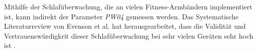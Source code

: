 Mithilfe der Schlafüberwachung, die an vielen Fitness-Armbändern implementiert ist, kann indirekt der Parameter \textit{PW04} gemessen werden. Das Systematische Literaturreview von Evenson et al. hat herausgearbeitet, dass die Validität und Vertrauenswürdigkrit dieser Schlafüberwachung bei sehr vielen Geräten sehr hoch ist \cite{reviewconsumerwearables}.

